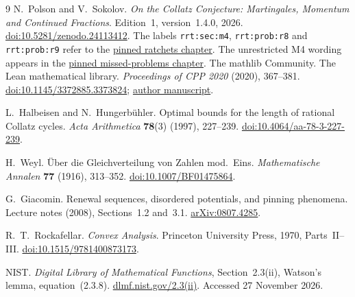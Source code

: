 \documentclass[11pt,letterpaper]{article}
\begin{document}
\begin{thebibliography}{9}
N.~Polson and V.~Sokolov.
\emph{On the Collatz Conjecture: Martingales, Momentum and Continued Fractions}.
Edition~1, version~1.4.0, 2026.
\href{https://doi.org/10.5281/zenodo.24113412}{doi:10.5281/zenodo.24113412}.
The labels \texttt{rrt:sec:m4}, \texttt{rrt:prob:r8} and
\texttt{rrt:prob:r9} refer to the
\href{https://github.com/VadimSokolov/collatz/blob/5840497a23fc0d64127b850aea68862d7c93f2b7/book/chapters/ch10h_ratchets.tex}{pinned ratchets chapter}.
The unrestricted M4 wording appears in the
\href{https://github.com/VadimSokolov/collatz/blob/5840497a23fc0d64127b850aea68862d7c93f2b7/book/chapters/ch10f_missed.tex}{pinned missed-problems chapter}.
The mathlib Community. The Lean mathematical library.
\emph{Proceedings of CPP 2020} (2020), 367--381.
\href{https://doi.org/10.1145/3372885.3373824}{doi:10.1145/3372885.3373824};
\href{https://arxiv.org/abs/1910.09336}{author manuscript}.

L.~Halbeisen and N.~Hungerb\"uhler.
Optimal bounds for the length of rational Collatz cycles.
\emph{Acta Arithmetica} \textbf{78}(3) (1997), 227--239.
\href{https://doi.org/10.4064/aa-78-3-227-239}{doi:10.4064/aa-78-3-227-239}.

H.~Weyl. \"Uber die Gleichverteilung von Zahlen mod.~Eins.
\emph{Mathematische Annalen} \textbf{77} (1916), 313--352.
\href{https://doi.org/10.1007/BF01475864}{doi:10.1007/BF01475864}.

G.~Giacomin. Renewal sequences, disordered potentials, and pinning phenomena.
Lecture notes (2008), Sections~1.2 and~3.1.
\href{https://arxiv.org/abs/0807.4285}{arXiv:0807.4285}.

R.~T.~Rockafellar. \emph{Convex Analysis}.
Princeton University Press, 1970, Parts~II--III.
\href{https://doi.org/10.1515/9781400873173}{doi:10.1515/9781400873173}.

NIST. \emph{Digital Library of Mathematical Functions}, Section~2.3(ii),
Watson's lemma, equation~(2.3.8).
\href{https://dlmf.nist.gov/2.3#ii}{dlmf.nist.gov/2.3(ii)}.
Accessed 27 November 2026.
\end{thebibliography}
\end{document}
